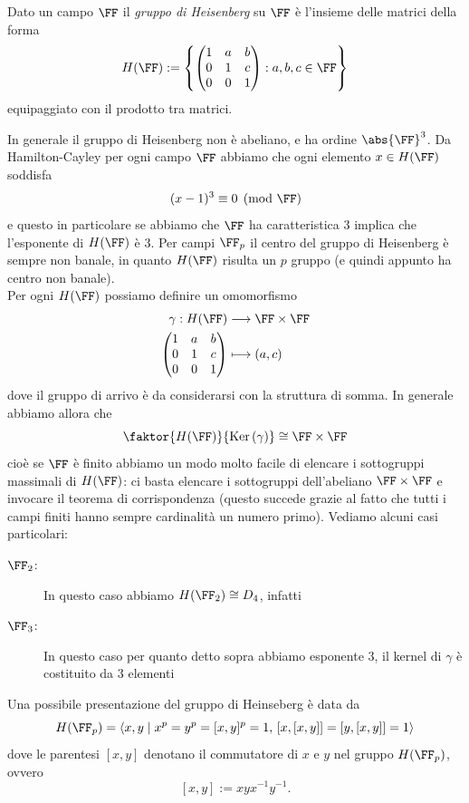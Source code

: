 \documentclass[11pt]{scrartcl}
\renewcommand{\ker}[1]{\text{Ker}\left(#1\right)}
\begin{document}
	\begin{definition}
		Dato un campo $\FF$ il \textit{gruppo di Heisenberg} su $\FF$ è l'insieme delle matrici della forma
		$$H(\FF):=\left\{\begin{pmatrix}
			1 & a & b \\
			0 & 1 & c \\
			0 & 0 & 1
		\end{pmatrix}:a,b,c\in \FF\right\}$$
		equipaggiato con il prodotto tra matrici.
	\end{definition}
	In generale il gruppo di Heisenberg non è abeliano, e ha ordine $\abs{\FF}^3$. Da Hamilton-Cayley per ogni campo $\FF$ abbiamo che ogni elemento $x\in H(\FF)$ soddisfa
	$$(x-1)^3 \equiv 0 \pmod{\FF}$$
	e questo in particolare se abbiamo che $\FF$ ha caratteristica $3$ implica che l'esponente di $H(\FF)$ è $3$. Per campi $\FF_p$ il centro del gruppo di Heisenberg è sempre non banale, in quanto $H(\FF)$ risulta un $p$ gruppo (e quindi appunto ha centro non banale). \\
	Per ogni $H(\FF)$ possiamo definire un omomorfismo 
	\begin{align*}
		\gamma:H(\FF) & \longrightarrow \FF\times \FF \\
		\begin{pmatrix}
			1 & a & b \\
			0 & 1 & c \\
			0 & 0 & 1
		\end{pmatrix}& \longmapsto (a,c) 
	\end{align*}
	dove il gruppo di arrivo è da considerarsi con la struttura di somma.
	In generale abbiamo allora che 
	$$\faktor{H(\FF)}{\ker{\gamma}}\cong \FF\times \FF$$
	cioè se $\FF$ è finito abbiamo un modo molto facile di elencare i sottogruppi massimali di $H(\FF)$: ci basta elencare i sottogruppi dell'abeliano $\FF\times \FF$ e invocare il teorema di corrispondenza (questo succede grazie al fatto che tutti i campi finiti hanno sempre cardinalità un numero primo).
	Vediamo alcuni casi particolari:
	\begin{description}
		\item[$\FF_2$:] In questo caso abbiamo $H(\FF_2)\cong D_4$, infatti  
		\item[$\FF_3$:] In questo caso per quanto detto sopra abbiamo esponente $3$, il kernel di $\gamma$ è costituito da $3$ elementi 
	\end{description}
	\begin{fact}
		Una possibile presentazione del gruppo di Heinseberg è data da
		$$H(\FF_p)=\langle x,y \mid x^p= y^p = [x,y]^p=1,\, [x,[x,y]]=[y,[x,y]]=1 \rangle$$
		dove le parentesi $[x,y]$ denotano il commutatore di $x$ e $y$ nel gruppo $H(\FF_p)$, ovvero
		$$[x,y]:=xyx^{-1}y^{-1}.$$
	\end{fact}
\end{document}

